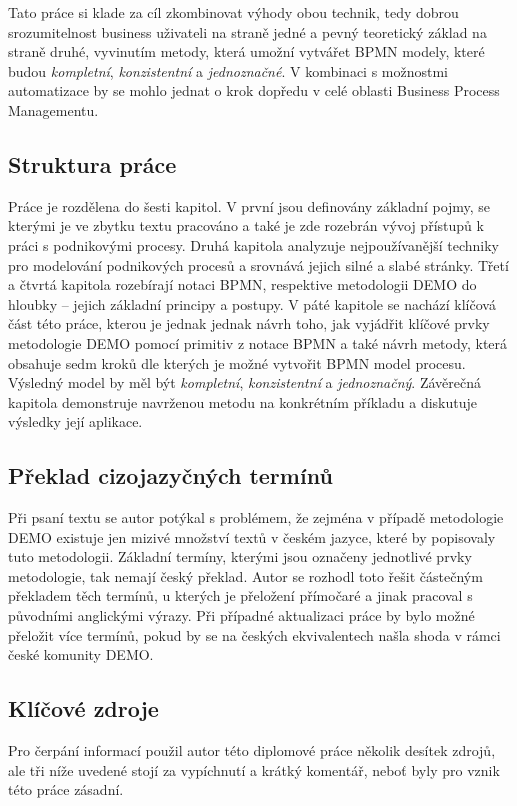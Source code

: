 Tato práce si klade za cíl zkombinovat výhody obou technik, tedy dobrou srozumitelnost business uživateli na straně jedné a pevný teoretický základ na straně druhé, vyvinutím metody, která umožní vytvářet BPMN modely, které budou \textit{kompletní}, \textit{konzistentní} a \textit{jednoznačné}. V kombinaci s možnostmi automatizace by se mohlo jednat o krok dopředu v celé oblasti Business Process Managementu.

\subsection{Struktura práce}
Práce je rozdělena do šesti kapitol. V první jsou definovány základní pojmy, se kterými je ve zbytku textu pracováno a také je zde rozebrán vývoj přístupů k práci s podnikovými procesy. Druhá kapitola analyzuje nejpoužívanější techniky pro modelování podnikových procesů a srovnává jejich silné a slabé stránky. Třetí a čtvrtá kapitola rozebírají notaci BPMN, respektive metodologii DEMO do hloubky – jejich základní principy a postupy. V páté kapitole se nachází klíčová část této práce, kterou je jednak jednak návrh toho, jak vyjádřit klíčové prvky metodologie DEMO pomocí primitiv z notace BPMN a také návrh metody, která obsahuje sedm kroků dle kterých je možné vytvořit BPMN model procesu. Výsledný model by měl být \textit{kompletní}, \textit{konzistentní} a \textit{jednoznačný}. Závěrečná kapitola demonstruje navrženou metodu na konkrétním příkladu a diskutuje výsledky její aplikace.

\subsection{Překlad cizojazyčných termínů}
Při psaní textu se autor potýkal s problémem, že zejména v případě metodologie DEMO existuje jen mizivé množství textů v českém jazyce, které by popisovaly tuto metodologii. Základní termíny, kterými jsou označeny jednotlivé prvky metodologie, tak nemají český překlad. Autor se rozhodl toto řešit částečným překladem těch termínů, u kterých je přeložení přímočaré a jinak pracoval s původními anglickými výrazy. Při případné aktualizaci práce by bylo možné přeložit více termínů, pokud by se na českých ekvivalentech našla shoda v rámci české komunity DEMO.

\subsection{Klíčové zdroje}
Pro čerpání informací použil autor této diplomové práce několik desítek zdrojů, ale tři níže uvedené stojí za vypíchnutí a krátký komentář, neboť byly pro vznik této práce zásadní.

